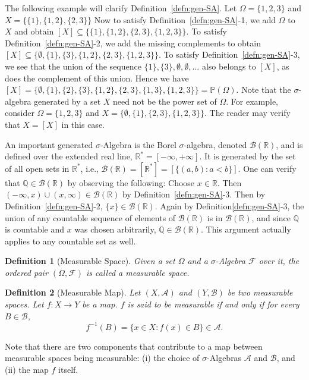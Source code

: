 \documentclass[10pt, oneside]{article}
\newcommand{\R}{\mathbb{R}}
\newcommand{\Q}{\mathbb{Q}}
\newtheorem{defn}{Definition}
\begin{document}
The following example will clarify Definition~\ref{defn:gen-SA}.
Let $\Omega = \{1,2,3\}$ and $X=\{\{1\},\{1,2\},\{2,3\}\}$
Now to satisfy Definition~\ref{defn:gen-SA}-1, we add $\Omega$ to $X$ and obtain $[X]\subseteq\{\{1\},\{1,2\},\{2,3\},\{1,2,3\}\}$.
To satisfy Definition~\ref{defn:gen-SA}-2, we add the missing complements to obtain $[X]\subseteq\{\emptyset, \{1\},\{3\},\{1,2\},\{2,3\},\{1,2,3\}\}$.
To satisfy Definition~\ref{defn:gen-SA}-3, we see that the union of the sequence $\{1\},\{3\},\emptyset,\emptyset,\ldots$ also belongs to $[X]$, as does the complement of this union. Hence we have $[X]= \{\emptyset, \{1\},\{2\},\{3\},\{1,2\},\{2,3\},\{1,3\},\{1,2,3\}\}=\mathbb{P}(\Omega)$.
Note that the $\sigma$-algebra generated by a set $X$ need not be the power set of $\Omega$.
For example, consider $\Omega=\{1,2,3\}$ and $X=\{\emptyset,\{1\},\{2,3\},\{1,2,3\}\}$.
The reader may verify that $X=[X]$ in this case.

An important generated $\sigma$-Algebra is the Borel $\sigma$-algebra, denoted 
$\mathcal{B}(\R)$, and is defined over the extended real line, $\R^{*} = [-\infty,
+\infty]$. It is generated by the set of all open sets in $\R^{*}$, i.e., 
$\mathcal{B}(\R) = [\R^{*}]=[\{(a,b):a<b\}]$. 
One can verify that $\Q\in \mathcal{B}(\R)$ by observing the following: Choose $x\in \R$. 
Then $(-\infty,x)\cup(x,\infty)\in \mathcal{B}(\R)$ by Definition~\ref{defn:gen-SA}-3.
Then by Definition~\ref{defn:gen-SA}-2, $\{x\}\in \mathcal{B}(\R)$.
Again by Definition\ref{defn:gen-SA}-3, the union of any countable sequence of elements of $\mathcal{B}(\R)$ is in $\mathcal{B}(\R)$, and since $\Q$ is countable and $x$ was chosen arbitrarily, $\Q\in \mathcal{B}(\R)$.
This argument actually applies to any countable set as well.

\begin{defn}[Measurable Space]
    \label{defn:space}
    Given a set $\Omega$ and a $\sigma$-Algebra $\mathcal{F}$ over it, the ordered 
    pair $(\Omega,\mathcal{F})$ is called a measurable space. 
\end{defn}

\begin{defn}[Measurable Map]
    \label{defn:map}
    Let $(X,\mathcal{A})$ and $(Y,\mathcal{B})$ be two measurable spaces. Let 
    $f \colon X \to Y$ be a map. $f$ is said to be measurable if and only if 
    for every $B \in \mathcal{B}$, 
    \[f^{-1}(B) = \{x \in X \colon f(x) \in B\} \in \mathcal{A}.\]
\end{defn}

Note that there are two components that contribute to a map between measurable spaces
being measurable: (i) the choice of $\sigma$-Algebras $\mathcal{A}$ and $\mathcal{B}$,
and (ii) the map $f$ itself. 
\end{document}
